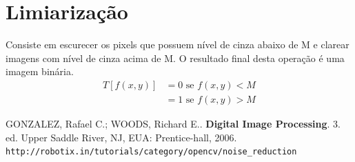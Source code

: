 \documentclass[10pt,a4paper]{article}
\begin{document}
\section{Limiarização}
Consiste em escurecer os pixels que possuem nível de cinza abaixo de M e clarear imagens com nível de cinza acima de M. O resultado final desta operação é uma imagem binária.
\begin{align*}
    T[f(x,y)] &= 0 \text{ se } f(x,y) < M \\
              &= 1 \text{ se } f(x,y) > M
\end{align*}

\begin{thebibliography}{99}
     GONZALEZ, Rafael C.; WOODS, Richard E.. \textbf{Digital Image Processing}. 3. ed. Upper Saddle River, NJ, EUA: Prentice-hall, 2006.
     \texttt{http://robotix.in/tutorials/category/opencv/noise\_reduction}
\end{thebibliography}
\end{document}
